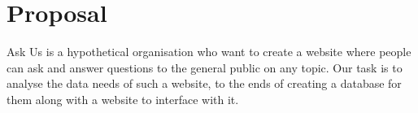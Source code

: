 \section{Proposal}

Ask Us is a hypothetical organisation who want to create a website where people can ask and answer questions to the general public on any topic. Our task is to analyse the data needs of such a website, to the ends of creating a database for them along with a website to interface with it.
